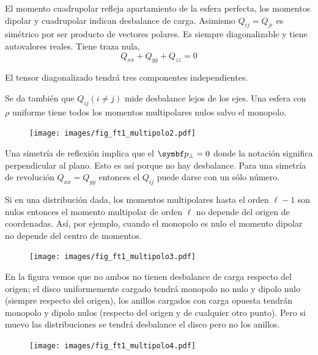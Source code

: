\documentclass[10pt,oneside]{CBFT_book}
\begin{document}
El momento cuadrupolar refleja apartamiento de la esfera perfecta, los momentos dipolar y cuadrupolar
indican desbalance de carga.
Asimismo $Q_{ij} = Q_{ji}$ es simétrico por ser producto de vectores polares.
Es siempre diagonalizable y tiene autovalores reales. 
Tiene traza nula,
\[
	Q_{xx} + Q_{yy} + Q_{zz}  = 0
\]

El tensor diagonalizado tendrá tres componentes independientes.


Se da también que $Q_{ij} (i\neq j)$ mide desbalance lejos de los ejes.
Una esfera con $\rho$ uniforme tiene todos los momentos multipolares nulos salvo el monopolo.

\begin{figure}[htb]
	\begin{center}
	\texttt{[image: images/fig\_ft1\_multipolo2.pdf]}	 
	\end{center}
	\caption{}
\end{figure}

Una simetría de reflexión implica que el $\vb{p}_\perp = 0$ donde la notación significa perpendicular
al plano. Esto es así porque no hay desbalance. Para una simetría de revolución $Q_{xx}=Q_{yy}$ entonces
el $Q_{ij}$ puede darse con un sólo número.

Si en una distribución dada, los momentos multipolares hasta el orden $\ell -1$ son nulos entonces
el momento multipolar de orden $\ell$ no depende del origen de coordenadas.
Así, por ejemplo, cuando el monopolo es nulo el momento dipolar no depende del centro de momentos.

\begin{figure}[htb]
	\begin{center}
	\texttt{[image: images/fig\_ft1\_multipolo3.pdf]}	 
	\end{center}
	\caption{}
\end{figure}

En la figura vemos que no ambos no tienen desbalance de carga respecto del origen; el disco uniformemente
cargado tendrá monopolo no nulo y dipolo nulo (siempre respecto del origen), los anillos cargados con carga
opuesta tendrán monopolo y dipolo nulos (respecto del origen y de cualquier otro punto). Pero si muevo las
distribuciones se tendrá desbalance el disco pero no los anillos.

\begin{figure}[htb]
	\begin{center}
	\texttt{[image: images/fig\_ft1\_multipolo4.pdf]}	 
	\end{center}
	\caption{}
\end{figure}
\end{document}
